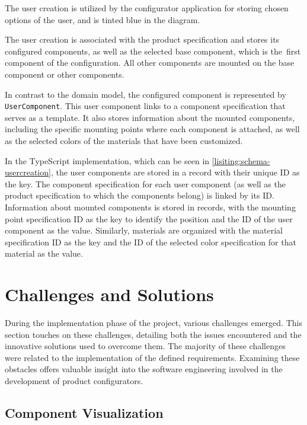 The user creation is utilized by the configurator application for storing chosen options of the user, and is tinted blue in the  diagram.

The user creation is associated with the product specification and stores its configured components, as well as the selected base component, which is the~first component of the configuration. All other components are mounted on the base component or other components.

In contrast to the domain model, the configured component is represented by \texttt{UserComponent}. This user component links to a component specification that serves as a template. It also stores information about the mounted components, including the specific mounting points where each component is attached, as well as the selected colors of the materials that have been customized.

In the TypeScript implementation, which can be seen in \autoref{lisiting:schema-usercreation}, the user components are stored in a record with their unique ID as the key. The component specification for each user component (as well as the product specification to which the components belong) is linked by its ID. Information about mounted components is stored in records, with the mounting point specification ID as the key to identify the position and the ID of the user component as the value. Similarly, materials are organized with the material specification ID as the key and the ID of the selected color specification for that material as the value.


\section{Challenges and Solutions}

During the implementation phase of the project, various challenges emerged. This section touches on these challenges, detailing both the issues encountered and the innovative solutions used to overcome them. The majority of these challenges were related to the implementation of the defined requirements. Examining these obstacles offers valuable insight into the software engineering involved in the development of product configurators.


\subsection{Component Visualization}

